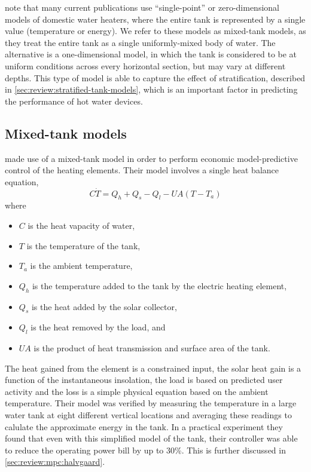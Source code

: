 \textcite{Vrettos12} note that many current publications use ``single-point'' or zero-dimensional models of domestic water heaters, where the entire tank is represented by a single value (temperature or energy).
We refer to these models as mixed-tank models, as they treat the entire tank as a single uniformly-mixed body of water.
The alternative is a one-dimensional model, in which the tank is considered to be at uniform conditions across every horizontal section, but may vary at different depths.
This type of model is able to capture the effect of stratification, described in \autoref{sec:review:stratified-tank-models}, which is an important factor in predicting the performance of hot water devices.

\subsection{Mixed-tank models}
\label{sec:review:mixed-tank}


\textcite{Halvgaard12} made use of a mixed-tank model in order to perform economic model-predictive control of the heating elements.
Their model involves a single heat balance equation,
$$ C \dot{T} = Q_h + Q_s - Q_l - U A (T - T_a) $$
where
\begin{itemize}
   \item $C$ is the heat vapacity of water,
   \item $T$ is the temperature of the tank,
   \item $T_a$ is the ambient temperature,
   \item $Q_h$ is the temperature added to the tank by the electric heating element,
   \item $Q_s$ is the heat added by the solar collector,
   \item $Q_l$ is the heat removed by the load, and
   \item $U A$ is the product of heat transmission and surface area of the tank.
\end{itemize}
The heat gained from the element is a constrained input, the solar heat gain is a function of the instantaneous insolation, the load is based on predicted user activity and the loss is a simple physical equation based on the ambient temperature.
Their model was verified by measuring the temperature in a large water tank at eight different vertical locations and averaging these readings to calulate the approximate energy in the tank.
In a practical experiment they found that even with this simplified model of the tank, their controller was able to reduce the operating power bill by up to 30\%.
This is further discussed in \autoref{sec:review:mpc:halvgaard}.

